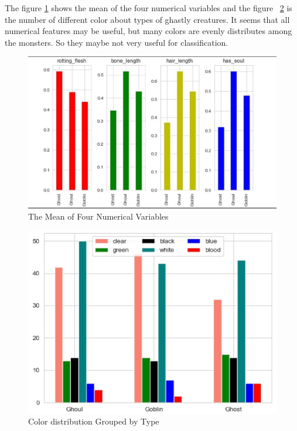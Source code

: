 The figure \ref{fig:his_1} 
shows the mean of the four numerical variables  
and the figure ~\cref{fig:his_2} 
is the number of different color 
about types of ghastly creatures.
It seems that all numerical features may be useful, 
but many colors are evenly distributes among the monsters. 
So they maybe not very useful for classification.


\begin{figure}[htbp]
	\centering
	\label{fig:his_1}
	\includegraphics[scale=0.3]{figures/his_1.eps}
	\caption{The Mean of Four Numerical Variables}
\end{figure}


\begin{figure}[htbp]
	\centering
	\label{fig:his_2}
	\includegraphics[scale=0.3]{figures/his_2.eps}
	\caption{Color distribution Grouped by Type}
\end{figure}


